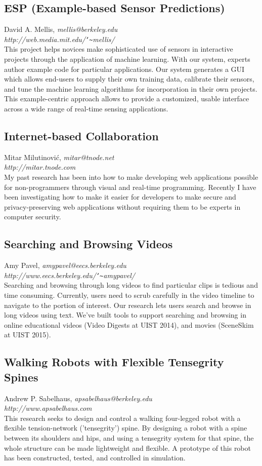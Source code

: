 \documentclass[foldmark,10pt,a4paper,notumble]{leaflet}
\newcommand{\name}[1]{#1,}
\newcommand{\email}[1]{\emph{#1}}
\newcommand{\website}[1]{\\\emph{#1}\\[3pt]}
\begin{document}
\subsection{ESP (Example-based Sensor Predictions)}
\name{David A. Mellis}
\email{mellis@berkeley.edu}
\website{http://web.media.mit.edu/\texttt{\char`\~}mellis/}
This project helps novices make sophisticated use of sensors in interactive projects through the application of machine learning. With our system, experts author example code for particular applications. Our system generates a GUI which allows end-users to supply their own training data, calibrate their sensors, and tune the machine learning algorithms for incorporation in their own projects. This example-centric approach allows to provide a customized, usable interface across a wide range of real-time sensing applications.

\subsection{Internet-based Collaboration}
\name{Mitar Milutinovi\'c}
\email{mitar@tnode.net}
\website{http://mitar.tnode.com}
My past research has been into how to make developing web applications
possible for non-programmers through visual and real-time programming.
Recently I have been investigating how to make it easier for developers
to make secure and privacy-preserving web applications without requiring
them to be experts in computer security.

\subsection{Searching and Browsing Videos}
\name{Amy Pavel}
\email{amypavel@eecs.berkeley.edu}
\website{http://www.eecs.berkeley.edu/\texttt{\char`\~}amypavel/}
Searching and browsing through long videos to find particular clips is tedious and time consuming. Currently, users need to scrub carefully in the video timeline to navigate to the portion of interest. Our research lets users search and browse in long videos using text. We've built tools to support searching and browsing in online educational videos (Video Digests at UIST 2014), and movies (SceneSkim at UIST 2015).

\subsection{Walking Robots with Flexible Tensegrity Spines}
\name{Andrew P. Sabelhaus}
\email{apsabelhaus@berkeley.edu}
\website{http://www.apsabelhaus.com}
This research seeks to design and control a walking four-legged robot with a flexible tension-network ('tensegrity') spine. By designing a robot with a spine between its shoulders and hips, and using a tensegrity system for that spine, the whole structure can be made lightweight and flexible. A prototype of this robot has been constructed, tested, and controlled in simulation.
\end{document}

